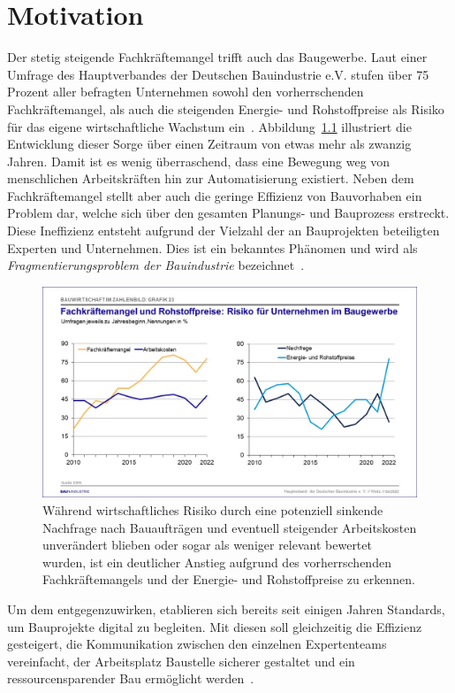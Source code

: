 \chapter{Motivation}\label{motivation}
Der stetig steigende Fachkräftemangel trifft auch das Baugewerbe. 
Laut einer Umfrage des Hauptverbandes der Deutschen Bauindustrie e.V. stufen über 75 Prozent aller befragten Unternehmen sowohl den vorherrschenden Fachkräftemangel, als auch die steigenden Energie- und Rohstoffpreise als Risiko für das eigene wirtschaftliche Wachstum ein~\cite{Bauindustrie:online}.
Abbildung~\ref{fig:Fachkraeftemangel} illustriert die Entwicklung dieser Sorge über einen Zeitraum von etwas mehr als zwanzig Jahren.
Damit ist es wenig überraschend, dass eine Bewegung weg von menschlichen Arbeitskräften hin zur Automatisierung existiert.
Neben dem Fachkräftemangel stellt aber auch die geringe Effizienz von Bauvorhaben ein Problem dar, welche sich über den gesamten Planungs- und Bauprozess erstreckt. 
Diese Ineffizienz entsteht aufgrund der Vielzahl der an Bauprojekten beteiligten Experten und Unternehmen.
Dies ist ein bekanntes Phänomen und wird als \textit{Fragmentierungsproblem der Bauindustrie} bezeichnet~\cite{ConstructionFragmentation}.
\begin{figure}[h]
    \centering
    \includegraphics[width=0.7\columnwidth]{fig/Grafik_23.jpg}
    \caption{Während wirtschaftliches Risiko durch eine potenziell sinkende Nachfrage nach Bauaufträgen und eventuell steigender Arbeitskosten unverändert blieben oder sogar als weniger relevant bewertet wurden, ist ein deutlicher Anstieg aufgrund des vorherrschenden Fachkräftemangels und der Energie- und Rohstoffpreise zu erkennen.}\label{fig:Fachkraeftemangel}
\end{figure}
Um dem entgegenzuwirken, etablieren sich bereits seit einigen Jahren Standards, um Bauprojekte digital zu begleiten.
Mit diesen soll gleichzeitig die Effizienz gesteigert, die Kommunikation zwischen den einzelnen Expertenteams vereinfacht, der Arbeitsplatz \glqq{}Baustelle\grqq{} sicherer gestaltet und ein ressourcensparender Bau ermöglicht werden~\cite{BIMforHe12:online}\cite{Top10Ben31:online}.
